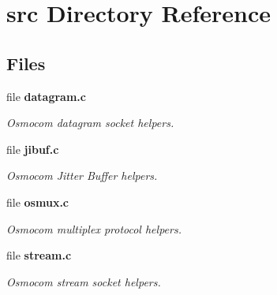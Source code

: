 \section{src Directory Reference}
\label{dir_68267d1309a1af8e8297ef4c3efbcdba}
\subsection*{Files}
\begin{DoxyCompactItemize}
\item 
file {\bf datagram.\+c}
\begin{DoxyCompactList}\small\item\em Osmocom datagram socket helpers. \end{DoxyCompactList}\item 
file {\bf jibuf.\+c}
\begin{DoxyCompactList}\small\item\em Osmocom Jitter Buffer helpers. \end{DoxyCompactList}\item 
file {\bf osmux.\+c}
\begin{DoxyCompactList}\small\item\em Osmocom multiplex protocol helpers. \end{DoxyCompactList}\item 
file {\bf stream.\+c}
\begin{DoxyCompactList}\small\item\em Osmocom stream socket helpers. \end{DoxyCompactList}\end{DoxyCompactItemize}
